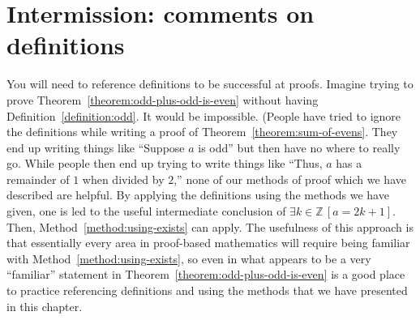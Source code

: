 \documentclass{book}
\theoremstyle{ekimcustom}
\begin{document}
\section{Intermission: comments on definitions}\label{section:comments-on-definitions}

You will need to reference definitions to be successful at proofs. Imagine trying to prove Theorem~\ref{theorem:odd-plus-odd-is-even} without having Definition~\ref{definition:odd}. It would be impossible. (People have tried to ignore the definitions while writing a proof of Theorem~\ref{theorem:sum-of-evens}. They end up writing things like ``Suppose $a$ is odd'' but then have no where to really go. While people then end up trying to write things like ``Thus, $a$ has a remainder of $1$ when divided by $2$,'' none of our methods of proof which we have described are helpful. By applying the definitions using the methods we have given, one is led to the useful intermediate conclusion of $\exists k \in \mathbb{Z}\,[a=2k+1]$. Then, Method~\ref{method:using-exists} can apply. The usefulness of this approach is that essentially every area in proof-based mathematics will require being familiar with Method~\ref{method:using-exists}, so even in what appears to be a very ``familiar'' statement in Theorem~\ref{theorem:odd-plus-odd-is-even} is a good place to practice referencing definitions and using the methods that we have presented in this chapter.
\end{document}

